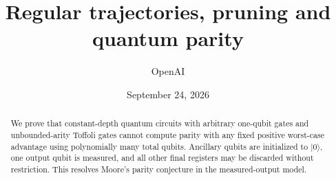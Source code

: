 \documentclass[11pt]{article}
\title{Regular trajectories, pruning and quantum parity}
\author{OpenAI}
\date{September 24, 2026}
\theoremstyle{definition}
\theoremstyle{remark}
\numberwithin{equation}{section}
\begin{document}
\maketitle
\begin{abstract}
We prove that constant-depth quantum circuits with arbitrary one-qubit
gates and unbounded-arity Toffoli gates cannot compute parity with
any fixed positive worst-case advantage using polynomially many total
qubits. Ancillary qubits are initialized to $|0\rangle$, one output qubit
is measured, and all other final registers may be discarded without
restriction. This resolves Moore's parity conjecture in the
measured-output model.
\end{abstract}
\setcounter{tocdepth}{1}
\tableofcontents







\renewcommand{\bibsection}{%
  \section*{\refname}%
  \addcontentsline{toc}{section}{\refname}}
\setlength{\bibsep}{3pt plus .2pt minus .2pt}


\end{document}
